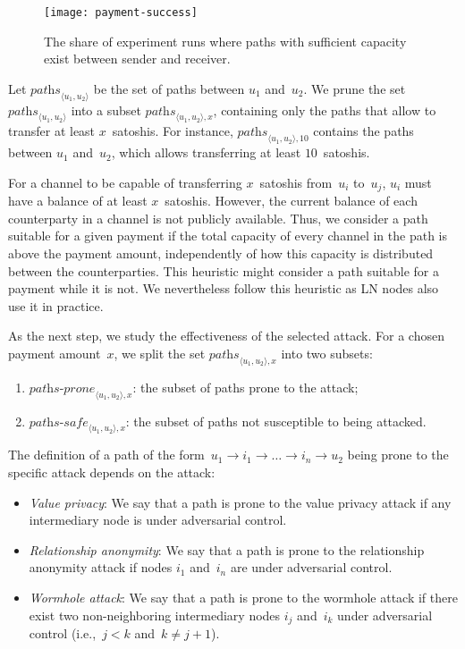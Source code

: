\begin{figure}
	\centering
	\texttt{[image: payment-success]}
	\caption{The share of experiment runs where paths with sufficient capacity exist between sender and receiver.}
	\label{fig:payment-success}
\end{figure}

Let $\textit{paths}_{\langle u_1, u_2 \rangle}$ be the set of paths between $u_1$ and~$u_2$.
We prune the set $\textit{paths}_{\langle u_1, u_2 \rangle}$ into a subset $\textit{paths}_{\langle u_1, u_2 \rangle, x}$, containing only the paths that allow to transfer at least $x$~satoshis.
For instance, $\textit{paths}_{\langle u_1, u_2 \rangle, 10}$ contains the paths between $u_1$ and~$u_2$, which allows transferring at least $10$~satoshis.

For a channel to be capable of transferring $x$~satoshis from~$u_i$ to~$u_j$, $u_i$ must have a balance of at least $x$~satoshis.
However, the current balance of each counterparty in a channel is not publicly available.
Thus, we consider a path suitable for a given payment if the total capacity of every channel in the path is above the payment amount, independently of how this capacity is distributed between the counterparties.
This heuristic might consider a path suitable for a payment while it is not.
We nevertheless follow this heuristic as LN nodes also use it in practice.

As the next step, we study the effectiveness of the selected attack.
For a chosen payment amount~$x$, we split the set $\textit{paths}_{\langle u_1, u_2 \rangle, x}$ into two subsets:

\begin{enumerate}
	\item $\textit{paths-prone}_{\langle u_1, u_2 \rangle, x}$: the subset of paths prone to the attack;
	\item $\textit{paths-safe}_{\langle u_1, u_2 \rangle, x}$: the subset of paths not susceptible to being attacked.
\end{enumerate}

The definition of a path of the form~$u_1 \rightarrow i_1 \rightarrow \ldots \rightarrow i_n \rightarrow u_2$ being prone to the specific attack depends on the attack:

\begin{itemize}
	\item \textit{Value privacy}: We say that a path is prone to the value privacy attack if any intermediary node is under adversarial control.
	
	\item \textit{Relationship anonymity}: We say that a path is prone to the relationship anonymity attack if nodes $i_1$ and~$i_n$ are under adversarial control.
	
	\item \textit{Wormhole attack}: We say that a path is prone to the wormhole attack if there exist two non-neighboring intermediary nodes $i_j$ and~$i_k$  under adversarial control (i.e.,~$j < k$ and~$k \neq j + 1$).
\end{itemize}

